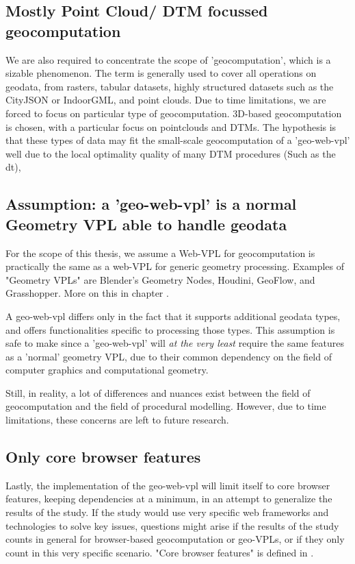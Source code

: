 \subsection*{Mostly Point Cloud/ DTM focussed geocomputation}
We are also required to concentrate the scope of 'geocomputation', which is a sizable phenomenon.
The term is generally used to cover all operations on geodata, from rasters, tabular datasets, highly structured datasets such as the CityJSON or IndoorGML, and point clouds. 
Due to time limitations, we are forced to focus on particular type of geocomputation.
3D-based geocomputation is chosen, with a particular focus on pointclouds and DTMs. 
The hypothesis is that these types of data may fit the small-scale geocomputation of a 'geo-web-vpl' well due to the local optimality quality of many DTM procedures (Such as the \ac{dt}), 

\subsection*{Assumption: a '\ac{geo-web-vpl}' is a normal Geometry VPL able to handle geodata}
For the scope of this thesis, we assume a Web-VPL for geocomputation is practically the same as a web-VPL for generic geometry processing.
Examples of "Geometry VPLs" are Blender's Geometry Nodes, Houdini, GeoFlow, and Grasshopper.
More on this in chapter .

A geo-web-vpl differs only in the fact that it supports additional geodata types, and offers functionalities specific to processing those types.  
This assumption is safe to make since a 'geo-web-vpl' will \emph{at the very least} require the same features as a 'normal' geometry VPL, due to their common dependency on the field of computer graphics and computational geometry.

Still, in reality, a lot of differences and nuances exist between the field of geocomputation and the field of procedural modelling. 
However, due to time limitations, these concerns are left to future research.
 
\subsection*{Only core browser features}
Lastly, the implementation of the geo-web-vpl will limit itself to core browser features, keeping dependencies at a minimum, in an attempt to generalize the results of the study.
If the study would use very specific web frameworks and technologies to solve key issues, questions might arise if the results of the study counts in general for browser-based geocomputation or geo-VPLs, or if they only count in this very specific scenario. 
"Core browser features" is defined in .

